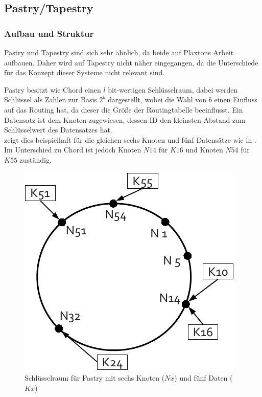 \subsection{Pastry/Tapestry}
\label{chap:evaluation_pastry}

\subsubsection{Aufbau und Struktur}
Pastry \cite{Rowstron2001} und Tapestry \cite{Zhao2001Tapestry,Zhao2004Tapestry} sind sich sehr ähnlich, da beide auf Plaxtons Arbeit \cite{Plaxton1997Accessing} aufbauen. Daher wird auf Tapestry nicht näher eingegangen, da die Unterschiede für das Konzept dieser Systeme nicht relevant sind.

Pastry besitzt wie Chord einen $l$ bit-wertigen Schlüsselraum, dabei werden Schlüssel als Zahlen zur Basis $2^b$ dargestellt, wobei die Wahl von $b$ einen Einfluss auf das Routing hat, da dieser die Größe der Routingtabelle beeinflusst. Ein Datensatz ist dem Knoten zugewiesen, dessen ID den kleinsten Abstand zum Schlüsselwert des Datensatzes hat.\\
 zeigt dies beispielhaft für die gleichen sechs Knoten und fünf Datensätze wie in . Im Unterschied zu Chord ist jedoch Knoten $N14$ für $K16$ und Knoten $N54$ für $K55$ zuständig.


\begin{figure}[htbp]
\centering
\includegraphics{grafics/pastry_key_space.pdf}
\caption{Schlüsselraum für Pastry mit sechs Knoten ($Nx$) und fünf Daten ($Kx$)}
\label{fig:pastry_key_space}
\end{figure}

